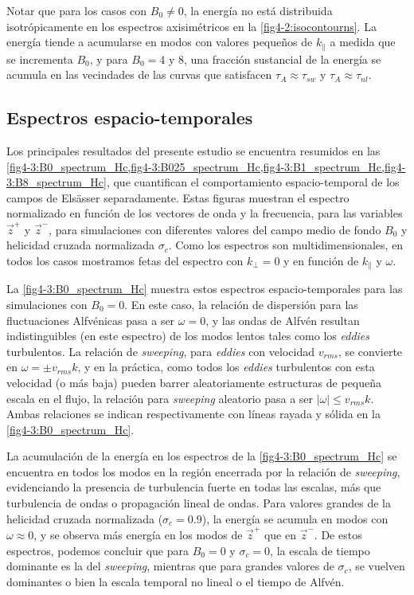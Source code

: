 Notar que para los casos con $B_0 \neq 0$, la energía no está
distribuida isotrópicamente en los espectros axisimétricos en la
\cref{fig4-2:isocontourns}. La energía tiende a acumularse en modos con
valores pequeños de $k_\parallel$ a medida que se incrementa $B_0$, y
para $B_0=4$ y $8$, una fracción sustancial de la energía se acumula
en las vecindades de las curvas que satisfacen
$\tau_A \approx \tau_{sw}$ y $\tau_A \approx \tau_{nl}$.


\subsection{Espectros espacio-temporales}\label{sec4:wk}

Los principales resultados del presente estudio se encuentra resumidos
en
las \cref{fig4-3:B0_spectrum_Hc,fig4-3:B025_spectrum_Hc,fig4-3:B1_spectrum_Hc,fig4-3:B8_spectrum_Hc},
que cuantifican el comportamiento espacio-temporal de los campos de
Els\"asser separadamente. Estas figuras muestran el espectro
normalizado en función de los vectores de onda y la frecuencia, para
las variables $\vec{z}^+$ y $\vec{z}^-$, para simulaciones con
diferentes valores del campo medio de fondo $B_0$ y helicidad cruzada
normalizada $\sigma_c$. Como los espectros son multidimensionales, en
todos los casos mostramos fetas del espectro con $k_\perp=0$ y en
función de $k_\parallel$ y $\omega$.

La \cref{fig4-3:B0_spectrum_Hc} muestra estos espectros
espacio-temporales para las simulaciones con $B_0=0$. En este caso, la
relación de dispersión para las fluctuaciones Alfvénicas pasa a ser
$\omega=0$, y las ondas de Alfvén resultan indistinguibles (en este
espectro) de los modos lentos tales como los \textit{eddies}
turbulentos. La relación de \textit{sweeping}, para \textit{eddies} con
velocidad $v_{rms}$, se convierte en $\omega=\pm v_{rms} k$, y en la
práctica, como todos los \textit{eddies} turbulentos con esta
velocidad (o más baja) pueden barrer aleatoriamente estructuras de
pequeña escala en el flujo, la relación para \textit{sweeping} aleatorio pasa
a ser $|\omega| \leq v_{rms} k$. Ambas relaciones se indican
respectivamente con líneas rayada y sólida en la
\cref{fig4-3:B0_spectrum_Hc}.

La acumulación de la energía en los espectros de la
\cref{fig4-3:B0_spectrum_Hc} se encuentra en todos los modos en la
región encerrada por la relación de \textit{sweeping}, evidenciando la
presencia de turbulencia fuerte en todas las escalas, más que
turbulencia de ondas o propagación lineal de ondas. Para valores
grandes de la helicidad cruzada normalizada ($\sigma_c = 0.9$), la
energía se acumula en modos con $\omega\approx 0$, y se observa más
energía en los modos de $\vec{z}^+$ que en $\vec{z}^-$. De estos
espectros, podemos concluir que para $B_0=0$ y $\sigma_c=0$, la escala
de tiempo dominante es la del \textit{sweeping}, mientras que para grandes
valores de $\sigma_c$, se vuelven dominantes o bien la escala temporal
no lineal o el tiempo de Alfvén.


